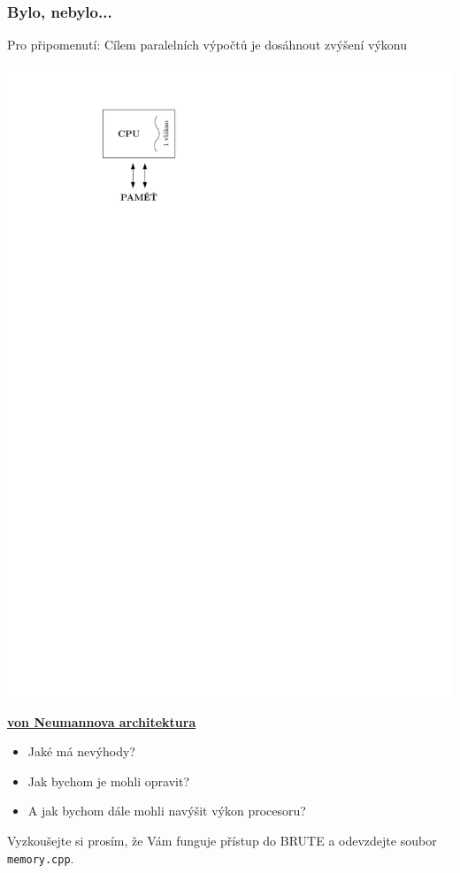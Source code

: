 \documentclass[usenames,dvipsnames,9pt]{beamer}
\newcommand{\see}[1]{\faEye\hspace{5pt}#1}
\begin{document}
\begin{frame}
  \frametitle{Bylo, nebylo...}
  Pro připomenutí: Cílem paralelních výpočtů je dosáhnout zvýšení výkonu
  \vfill
  \begin{minipage}{0.3\linewidth}
    \centering\includegraphics[width=0.7\linewidth]{figs/single_thread.pdf}
  \end{minipage}
  \hfill
  \begin{minipage}{0.6\linewidth}
    \textbf{\underline{von Neumannova architektura}}
    \begin{itemize}
      \item Jaké má nevýhody?
      \item Jak bychom je mohli opravit?
      \item A jak bychom dále mohli navýšit výkon procesoru?
    \end{itemize}
    \vspace{1em}
    \see{{\tt memory.cpp}}
  \end{minipage}

  \vspace{3em}

  \pause
  \alert{
    \Large
    Vyzkoušejte si prosím, že Vám funguje přístup do BRUTE a odevzdejte soubor \texttt{memory.cpp}.
  }
\end{frame}
\end{document}
